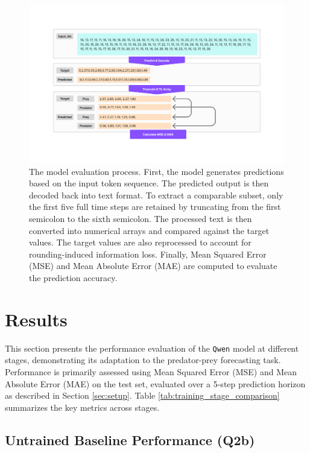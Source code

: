 \documentclass{article}
\begin{document}
\begin{figure}
    \centering
    \includegraphics[width=1\linewidth]{M2 Course Work//Images/Metric_calculation.png}
    \caption{The model evaluation process. First, the model generates predictions based on the input token sequence. The predicted output is then decoded back into text format. To extract a comparable subset, only the first five full time steps are retained by truncating from the first semicolon to the sixth semicolon. The processed text is then converted into numerical arrays and compared against the target values. The target values are also reprocessed to account for rounding-induced information loss. Finally, Mean Squared Error (MSE) and Mean Absolute Error (MAE) are computed to evaluate the prediction accuracy.}
    \label{fig:metric-calculation}
\end{figure}


\section{Results}
\label{sec:results}

This section presents the performance evaluation of the \texttt{Qwen} model at different stages, demonstrating its adaptation to the predator-prey forecasting task. Performance is primarily assessed using Mean Squared Error (MSE) and Mean Absolute Error (MAE) on the test set, evaluated over a 5-step prediction horizon as described in Section \ref{sec:setup}. Table \ref{tab:training_stage_comparison} summarizes the key metrics across stages.

\subsection{Untrained Baseline Performance (Q2b)}
\end{document}
